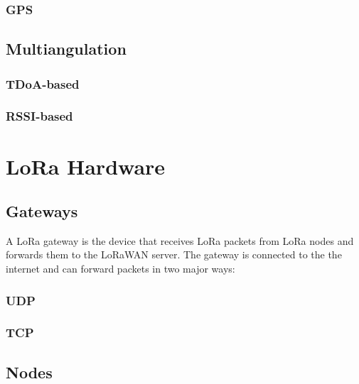 \subsubsection{\ac{GPS}}

\subsection{Multiangulation}

\subsubsection{\ac{TDoA}-based}

\subsubsection{\ac{RSSI}-based}

\section{\ac{LoRa} Hardware}

\subsection{Gateways}

A \ac{LoRa} gateway is the device that receives \ac{LoRa} packets from \ac{LoRa} nodes and forwards them to the \ac{LoRaWAN} server.
The gateway is connected to the the internet and can forward packets in two major ways:

\subsubsection{\ac{UDP}}

\subsubsection{\ac{TCP}}

\subsection{Nodes}